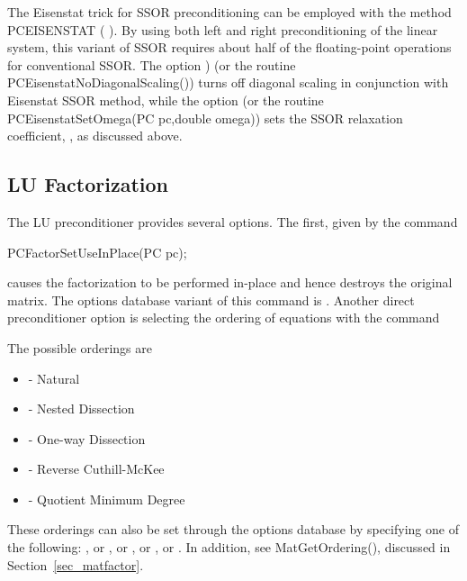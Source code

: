 The Eisenstat trick \cite{eisenstat81}  for SSOR preconditioning
can be employed with the method PCEISENSTAT
( ).
By using both left and right preconditioning of the linear system,
this variant of SSOR requires about half of the floating-point operations
for conventional SSOR. The option
)
(or the routine PCEisenstatNoDiagonalScaling())
turns off diagonal scaling in conjunction with Eisenstat SSOR method, while
the option  (or the routine
PCEisenstatSetOmega(PC pc,double omega))
sets the SSOR relaxation coefficient, , as discussed above.


\subsection{LU Factorization}
\label{sec_factorization}

The LU preconditioner provides several options.  The first, given by
the 
command  
\begin{tabbing}
  PCFactorSetUseInPlace(PC pc);
\end{tabbing}
causes the factorization to be performed in-place and hence
destroys the original matrix.  The options database variant of
this command is . 
Another direct preconditioner option is selecting the ordering
of equations with the command  
\begin{tabbing}
\end{tabbing}
The possible orderings are
\begin{itemize}
\item {} - Natural
\item {} - Nested Dissection
\item {} - One-way Dissection
\item {} - Reverse Cuthill-McKee
\item {} - Quotient Minimum Degree
\end{itemize}
  
  
 
 
These orderings can also be set through the options database by specifying
one of the following:   , or , or  , or , or .
In addition, see MatGetOrdering(), discussed in Section~\ref{sec_matfactor}.

